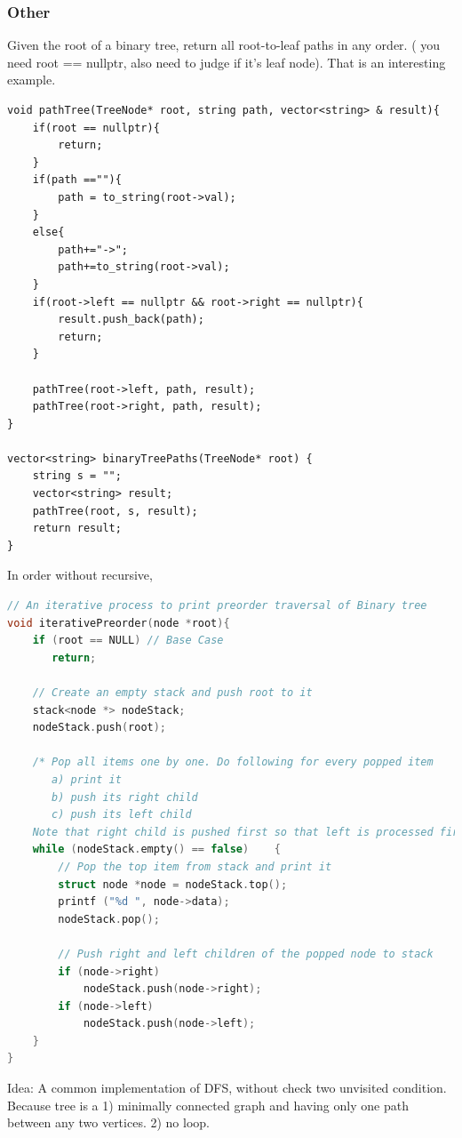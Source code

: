 \documentclass[a4paper,11pt,twoside]{book}
\begin{document}
\subsubsection{Other}

		
	\par Given the root of a binary tree, return all root-to-leaf paths in any order. ( you need root == nullptr, also need to judge if it's leaf node). That is an interesting example.  

\begin{lstlisting}
void pathTree(TreeNode* root, string path, vector<string> & result){
	if(root == nullptr){
		return;
	}
	if(path ==""){
		path = to_string(root->val);
	}
	else{
		path+="->";
		path+=to_string(root->val);
	}
	if(root->left == nullptr && root->right == nullptr){
		result.push_back(path);
		return;
	}
	
	pathTree(root->left, path, result);
	pathTree(root->right, path, result);
}

vector<string> binaryTreePaths(TreeNode* root) {
	string s = "";
	vector<string> result;
	pathTree(root, s, result);
	return result;
}
\end{lstlisting}


	\par In order without recursive, 
\begin{lstlisting}[frame=single, language=c++]
// An iterative process to print preorder traversal of Binary tree
void iterativePreorder(node *root){
    if (root == NULL) // Base Case
       return;
 
    // Create an empty stack and push root to it
    stack<node *> nodeStack;
    nodeStack.push(root);
 
    /* Pop all items one by one. Do following for every popped item
       a) print it
       b) push its right child
       c) push its left child
    Note that right child is pushed first so that left is processed first */
    while (nodeStack.empty() == false)    {
        // Pop the top item from stack and print it
        struct node *node = nodeStack.top();
        printf ("%d ", node->data);
        nodeStack.pop();
 
        // Push right and left children of the popped node to stack
        if (node->right)
            nodeStack.push(node->right);
        if (node->left)
            nodeStack.push(node->left);
    }
}
\end{lstlisting}

\par Idea: A common implementation of DFS, without check two unvisited condition. Because tree is a 1) minimally connected graph and having only one path between any two vertices. 2) no loop. 
\end{document}
